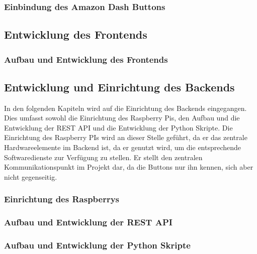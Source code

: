 \documentclass[ngerman]{scrartcl} %
\begin{document}
\subsubsection{Einbindung des Amazon Dash Buttons}  
\label{sec:Einbindung des Amazon Dash Buttons-1}

\newpage

\subsection{Entwicklung des Frontends}  
\label{sec:Entwicklung der Frontends-1} 

\subsubsection{Aufbau und Entwicklung des Frontends}  
\label{sec:Aufbau und Entwicklung des Frontends-1}

\newpage

\subsection{Entwicklung und Einrichtung des Backends}  
\label{sec:Entwicklung und Einrichtung des Backends-1} 

In den folgenden Kapiteln wird auf die Einrichtung des Backends eingegangen. Dies umfasst sowohl die Einrichtung des Raspberry Pis, den Aufbau und die Entwicklung der REST API und die Entwicklung der Python Skripte. Die Einrichtung des Raspberry PIs wird an dieser Stelle geführt, da er das zentrale Hardwareelemente im Backend ist, da er genutzt wird, um die entsprechende Softwaredienste zur Verfügung zu stellen. Er stellt den zentralen Kommunikationspunkt im Projekt dar, da die Buttons nur ihn kennen, sich aber nicht gegenseitig. 

\subsubsection{Einrichtung des Raspberrys}  
\label{sec:Einrichtung des Raspberrys-1}



\subsubsection{Aufbau und Entwicklung der REST API}  
\label{sec:Aufbau und Entwicklung der REST API-1}

\subsubsection{Aufbau und Entwicklung der Python Skripte}  
\label{sec:Aufbau und Entwicklung der Python Skripte-1}
\end{document}
